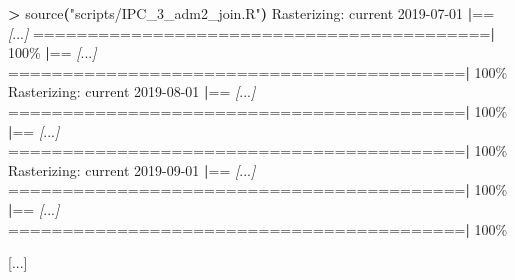 \documentclass[
  a4paper,
]{article}
\newenvironment{Shaded}{\begin{snugshade}}{\end{snugshade}}
\newcommand{\ExtensionTok}[1]{#1}
\newcommand{\KeywordTok}[1]{\textcolor[rgb]{0.13,0.29,0.53}{\textbf{#1}}}
\newcommand{\NormalTok}[1]{#1}
\newcommand{\OperatorTok}[1]{\textcolor[rgb]{0.81,0.36,0.00}{\textbf{#1}}}
\newcommand{\PreprocessorTok}[1]{\textcolor[rgb]{0.56,0.35,0.01}{\textit{#1}}}
\newcommand{\SpecialStringTok}[1]{\textcolor[rgb]{0.31,0.60,0.02}{#1}}
\newcommand{\StringTok}[1]{\textcolor[rgb]{0.31,0.60,0.02}{#1}}
\begin{document}
\begin{Shaded}
\begin{Highlighting}[]
\OperatorTok{\textgreater{}}\NormalTok{ source}\KeywordTok{(}\StringTok{"scripts/IPC\_3\_adm2\_join.R"}\KeywordTok{)}
\ExtensionTok{Rasterizing:}\NormalTok{ current 2019{-}07{-}01 }
  \KeywordTok{|}\ExtensionTok{==} \PreprocessorTok{[}\SpecialStringTok{...}\PreprocessorTok{]}\NormalTok{ ==========================================}\KeywordTok{|} \ExtensionTok{100\%}
  \KeywordTok{|}\ExtensionTok{==} \PreprocessorTok{[}\SpecialStringTok{...}\PreprocessorTok{]}\NormalTok{ ==========================================}\KeywordTok{|} \ExtensionTok{100\%}
\ExtensionTok{Rasterizing:}\NormalTok{ current 2019{-}08{-}01 }
  \KeywordTok{|}\ExtensionTok{==} \PreprocessorTok{[}\SpecialStringTok{...}\PreprocessorTok{]}\NormalTok{ ==========================================}\KeywordTok{|} \ExtensionTok{100\%}
  \KeywordTok{|}\ExtensionTok{==} \PreprocessorTok{[}\SpecialStringTok{...}\PreprocessorTok{]}\NormalTok{ ==========================================}\KeywordTok{|} \ExtensionTok{100\%}
\ExtensionTok{Rasterizing:}\NormalTok{ current 2019{-}09{-}01 }
  \KeywordTok{|}\ExtensionTok{==} \PreprocessorTok{[}\SpecialStringTok{...}\PreprocessorTok{]}\NormalTok{ ==========================================}\KeywordTok{|} \ExtensionTok{100\%}
  \KeywordTok{|}\ExtensionTok{==} \PreprocessorTok{[}\SpecialStringTok{...}\PreprocessorTok{]}\NormalTok{ ==========================================}\KeywordTok{|} \ExtensionTok{100\%}

\ExtensionTok{[...]}


\end{Highlighting}
\end{Shaded}
\end{document}
